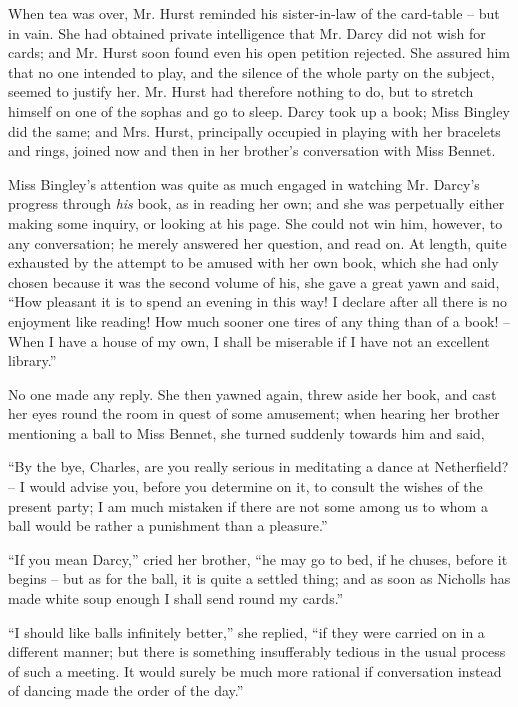 When tea was over, Mr. Hurst reminded his sister-in-law
of the card-table -- but in vain. She had obtained
private intelligence that Mr. Darcy did not wish for cards;
and Mr. Hurst soon found even his open petition rejected.
She assured him that no one intended to play, and the
silence of the whole party on the subject, seemed to justify
her. Mr. Hurst had therefore nothing to do, but to stretch
himself on one of the sophas and go to sleep. Darcy took
up a book; Miss Bingley did the same; and Mrs. Hurst,
principally occupied in playing with her bracelets and rings,
joined now and then in her brother’s conversation with
Miss Bennet.

Miss Bingley’s attention was quite as much engaged in
watching Mr. Darcy’s progress through \textit{his} book, as in
reading her own; and she was perpetually either making
some inquiry, or looking at his page. She could not win
him, however, to any conversation; he merely answered
her question, and read on. At length, quite exhausted
by the attempt to be amused with her own book, which
she had only chosen because it was the second volume
of his, she gave a great yawn and said, “How pleasant
it is to spend an evening in this way! I declare after all
there is no enjoyment like reading! How much sooner
one tires of any thing than of a book! -- When I have
a house of my own, I shall be miserable if I have not an
excellent library.”

No one made any reply. She then yawned again, threw
aside her book, and cast her eyes round the room in
quest of some amusement; when hearing her brother
mentioning a ball to Miss Bennet, she turned suddenly
towards him and said,

“By the bye, Charles, are you really serious in meditating
a dance at Netherfield? -- I would advise you, before
you determine on it, to consult the wishes of the present
party; I am much mistaken if there are not some among
us to whom a ball would be rather a punishment than
a pleasure.”

“If you mean Darcy,” cried her brother, “he may go
to bed, if he chuses, before it begins -- but as for the ball,
it is quite a settled thing; and as soon as Nicholls has
made white soup enough I shall send round my cards.”

“I should like balls infinitely better,” she replied, “if
they were carried on in a different manner; but there is
something insufferably tedious in the usual process of
such a meeting. It would surely be much more rational
if conversation instead of dancing made the order of
the day.”

